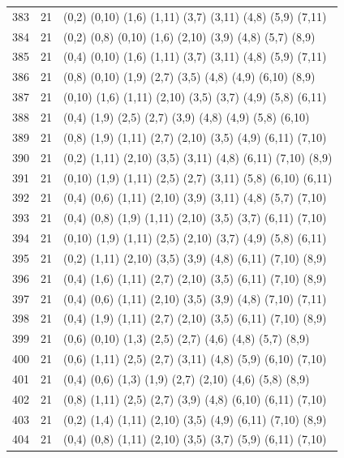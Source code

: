 \begin{appendix}
{\begin{longtable}{lll}
383& 21 & (0,2)   (0,10) (1,6)  (1,11)  (3,7)   (3,11)  (4,8)   (5,9)   (7,11)\\
384& 21 & (0,2)   (0,8)  (0,10) (1,6)   (2,10)  (3,9)   (4,8)   (5,7)   (8,9)\\
385& 21 & (0,4)   (0,10) (1,6)  (1,11)  (3,7)   (3,11)  (4,8)   (5,9)   (7,11)\\
386& 21 & (0,8)   (0,10) (1,9)  (2,7)   (3,5)   (4,8)   (4,9)   (6,10)  (8,9)\\
387& 21 & (0,10)  (1,6)  (1,11) (2,10)  (3,5)   (3,7)   (4,9)   (5,8)   (6,11)\\
388& 21 & (0,4)   (1,9)  (2,5)  (2,7)   (3,9)   (4,8)   (4,9)   (5,8)   (6,10)\\
389& 21 & (0,8)   (1,9)  (1,11) (2,7)   (2,10)  (3,5)   (4,9)   (6,11)  (7,10)\\
390& 21 & (0,2)   (1,11) (2,10) (3,5)   (3,11)  (4,8)   (6,11)  (7,10)  (8,9)\\
391& 21 & (0,10)  (1,9)  (1,11) (2,5)   (2,7)   (3,11)  (5,8)   (6,10)  (6,11)\\
392& 21 & (0,4)   (0,6)  (1,11) (2,10)  (3,9)   (3,11)  (4,8)   (5,7)   (7,10)\\
393& 21 & (0,4)   (0,8)  (1,9)  (1,11)  (2,10)  (3,5)   (3,7)   (6,11)  (7,10)\\
394& 21 & (0,10)  (1,9)  (1,11) (2,5)   (2,10)  (3,7)   (4,9)   (5,8)   (6,11)\\
395& 21 & (0,2)   (1,11) (2,10) (3,5)   (3,9)   (4,8)   (6,11)  (7,10)  (8,9)\\
396& 21 & (0,4)   (1,6)  (1,11) (2,7)   (2,10)  (3,5)   (6,11)  (7,10)  (8,9)\\
397& 21 & (0,4)   (0,6)  (1,11) (2,10)  (3,5)   (3,9)   (4,8)   (7,10)  (7,11)\\
398& 21 & (0,4)   (1,9)  (1,11) (2,7)   (2,10)  (3,5)   (6,11)  (7,10)  (8,9)\\
399& 21 & (0,6)   (0,10) (1,3)  (2,5)   (2,7)   (4,6)   (4,8)   (5,7)   (8,9)\\
400& 21 & (0,6)   (1,11) (2,5)  (2,7)   (3,11)  (4,8)   (5,9)   (6,10)  (7,10)\\
401& 21 & (0,4)   (0,6)  (1,3)  (1,9)   (2,7)   (2,10)  (4,6)   (5,8)   (8,9)\\
402& 21 & (0,8)   (1,11) (2,5)  (2,7)   (3,9)   (4,8)   (6,10)  (6,11)  (7,10)\\
403& 21 & (0,2)   (1,4)  (1,11) (2,10)  (3,5)   (4,9)   (6,11)  (7,10)  (8,9)\\
404& 21 & (0,4)   (0,8)  (1,11) (2,10)  (3,5)   (3,7)   (5,9)   (6,11)  (7,10)\\

\end{longtable}}
\end{appendix}
